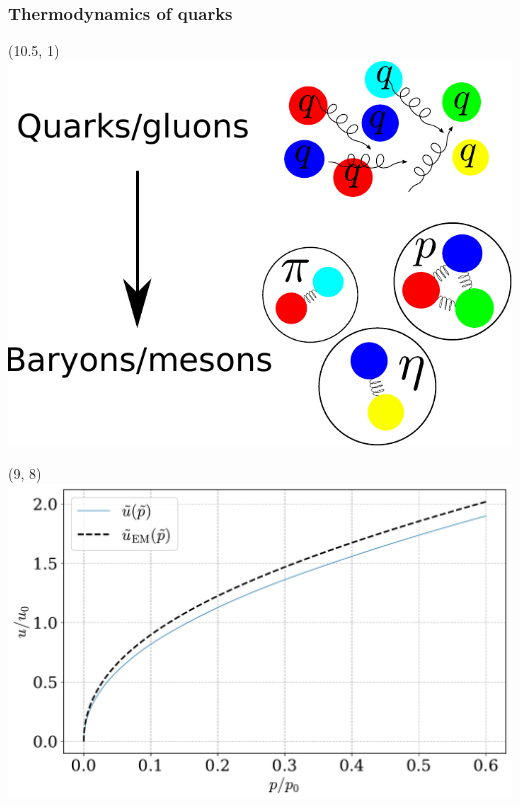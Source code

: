 \documentclass[aspectratio=169]{beamer}
\begin{document}
    \begin{frame}

        \frametitle{Thermodynamics of quarks}

        \begin{textblock}{4.8}(10.5, 1)
            \includegraphics[width=\textwidth]{quarks-to-mesons.pdf}
        \end{textblock}
        \begin{textblock}{6}(9, 8)
            \includegraphics[width=\textwidth]{../../scripts/figurer/pion_star/pion_eos_EM.pdf}
        \end{textblock}



\end{frame}
\end{document}
